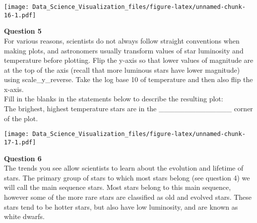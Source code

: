 \documentclass[]{article}
\newenvironment{Shaded}{\begin{snugshade}}{\end{snugshade}}
\newcommand{\DataTypeTok}[1]{\textcolor[rgb]{0.13,0.29,0.53}{#1}}
\newcommand{\KeywordTok}[1]{\textcolor[rgb]{0.13,0.29,0.53}{\textbf{#1}}}
\newcommand{\NormalTok}[1]{#1}
\newcommand{\OperatorTok}[1]{\textcolor[rgb]{0.81,0.36,0.00}{\textbf{#1}}}
\newcommand{\StringTok}[1]{\textcolor[rgb]{0.31,0.60,0.02}{#1}}
\begin{document}
\begin{Shaded}
\end{Shaded}

\texttt{[image: Data\_Science\_Visualization\_files/figure-latex/unnamed-chunk-16-1.pdf]}

\textbf{Question 5}\\
For various reasons, scientists do not always follow straight
conventions when making plots, and astronomers usually transform values
of star luminosity and temperature before plotting. Flip the y-axis so
that lower values of magnitude are at the top of the axis (recall that
more luminous stars have lower magnitude) using scale\_y\_reverse. Take
the log base 10 of temperature and then also flip the x-axis.\\
Fill in the blanks in the statements below to describe the resulting
plot:\\
The brighest, highest temperature stars are in the
\_\_\_\_\_\_\_\_\_\_\_\_\_\_ corner of the plot.

\begin{Shaded}
\end{Shaded}

\texttt{[image: Data\_Science\_Visualization\_files/figure-latex/unnamed-chunk-17-1.pdf]}

\textbf{Question 6}\\
The trends you see allow scientists to learn about the evolution and
lifetime of stars. The primary group of stars to which most stars belong
(see question 4) we will call the main sequence stars. Most stars belong
to this main sequence, however some of the more rare stars are
classified as old and evolved stars. These stars tend to be hotter
stars, but also have low luminosity, and are known as white dwarfs.
\end{document}
